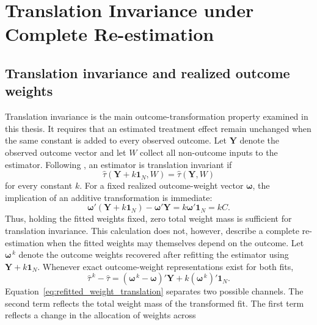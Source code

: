 \documentclass[12pt, a4paper, oneside]{article}
\theoremstyle{plain}
\theoremstyle{definition}
\begin{document}
\section{Translation Invariance under Complete Re-estimation}
\label{sec:translation_invariance}

\subsection{Translation invariance and realized outcome weights}

Translation invariance is the main outcome-transformation property examined in this
thesis. 
It requires that an estimated treatment effect remain
unchanged when the same constant is added to every observed outcome. Let
\(\mathbf Y\) denote the observed outcome vector and let \(W\) collect all
non-outcome inputs to the estimator. Following
\citet{sloczynski2025abadie}, an estimator is translation invariant if
\begin{equation}
    \widehat{\tau}(\mathbf Y+k\mathbf 1_N,W)
    =
    \widehat{\tau}(\mathbf Y,W)
    \label{eq:translation_invariance}
\end{equation}
for every constant \(k\).
For a fixed realized outcome-weight vector
\(\boldsymbol{\omega}\), the implication of an additive transformation is
immediate:
\begin{equation}
    \boldsymbol{\omega}'(\mathbf Y+k\mathbf 1_N)
    -
    \boldsymbol{\omega}'\mathbf Y
    =
    k\boldsymbol{\omega}'\mathbf 1_N
    =
    kC.
    \label{eq:fixed_weight_translation}
\end{equation}
Thus, holding the fitted weights fixed, zero total weight mass is sufficient
for translation invariance.
This calculation does not, however, describe a complete re-estimation when
the fitted weights may themselves depend on the outcome.
Let
\(\boldsymbol{\omega}^{\,k}\) denote the outcome weights recovered after
refitting the estimator using \(\mathbf Y+k\mathbf 1_N\). Whenever exact
outcome-weight representations exist for both fits,
\begin{equation}
    \widehat{\tau}^{\,k}-\widehat{\tau}
    =
    (\boldsymbol{\omega}^{\,k}-\boldsymbol{\omega})'\mathbf Y
    +
    k(\boldsymbol{\omega}^{\,k})'\mathbf 1_N.
    \label{eq:refitted_weight_translation}
\end{equation}
Equation~\eqref{eq:refitted_weight_translation} separates two possible
channels. The second term reflects the total weight mass of the transformed
fit. The first term reflects a change in the allocation of weights across
\end{document}
